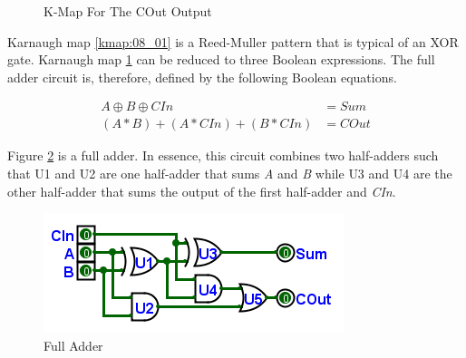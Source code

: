 \begin{figure}[H]
	\caption{K-Map For The COut Output}
	\label{kmap:08_02}
\end{figure}

Karnaugh map \ref{kmap:08_01} is a Reed-Muller pattern that is typical of an \textsf{XOR} gate. Karnaugh map \ref{kmap:08_02} can be reduced to three Boolean expressions. The full adder circuit is, therefore, defined by the following Boolean equations. 

\begin{align}
  \label{CL:eq:full_adder}
  A \oplus B \oplus CIn &= Sum \\
  \nonumber
  (A * B) + (A * CIn) + (B * CIn) &= COut
\end{align}

Figure \ref{fig:08_06} is a full adder. In essence, this circuit combines two half-adders such that \textsf{U1} and \textsf{U2} are one half-adder that sums \emph{A} and \emph{B} while \textsf{U3} and \textsf{U4} are the other half-adder that sums the output of the first half-adder and \emph{CIn}.

\begin{figure}[H]
	\centering
	\includegraphics[width=\maxwidth{.95\linewidth}]{gfx/08_06}
	\caption{Full Adder}
	\label{fig:08_06}
\end{figure}

